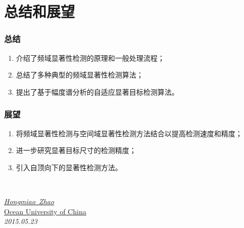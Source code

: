 \documentclass[notheorems,mathserif,table,compress]{beamer}  %
\begin{document}
\section{总结和展望}

\begin{frame}
  \frametitle{总结}
  \begin{enumerate}
  \item 介绍了频域显著性检测的原理和一般处理流程；
  \item 总结了多种典型的频域显著性检测算法；
  \item 提出了基于幅度谱分析的自适应显著目标检测算法。
  \end{enumerate}
\end{frame}

\begin{frame}
  \frametitle{展望}
  \begin{enumerate}
  \item 将频域显著性检测与空间域显著性检测方法结合以提高检测速度和精度；
  \item 进一步研究显著目标尺寸的检测精度；
  \item 引入自顶向下的显著性检测方法。
  \end{enumerate}
\end{frame}

\begin{frame}
\vspace{2cm}

\\
\vspace{1.5cm}

\begin{flushright}
\emph{\href{mailto:zhaohongmiao0627@226.com}{\textrm {Hongmiao~Zhao}}}\\
\href{http://www.ouc.edu.cn}{\textrm {Ocean University of China}}\\
\emph{\textrm {2015.05.23}}
\end{flushright}  
\end{frame}
\end{document}
